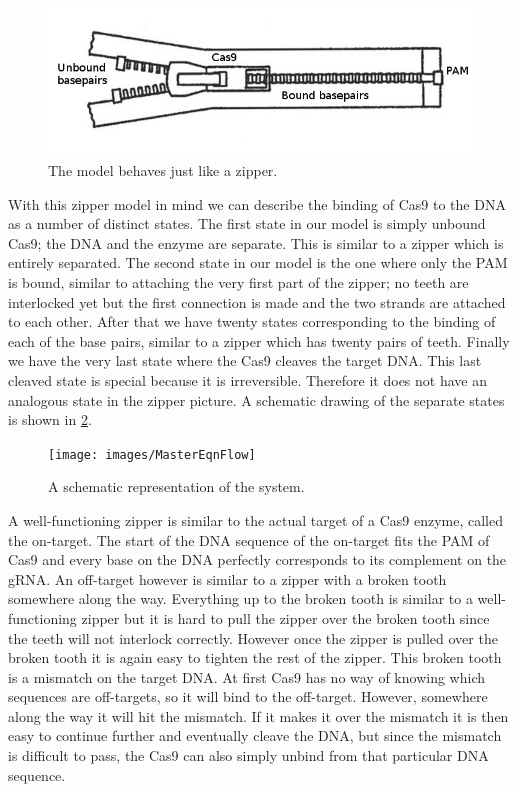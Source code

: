 \begin{figure}[H]
\begin{center}
\includegraphics[width=\textwidth]{images/zipper2}
\caption{The model behaves just like a zipper.}
\label{fig:zipper}
\end{center}
\end{figure}

With this zipper model in mind we can describe the binding of Cas9 to the DNA as a number of distinct states. The first state in our model is simply unbound Cas9; the DNA and the enzyme are separate. This is similar to a zipper which is entirely separated. The second state in our model is the one where only the PAM is bound, similar to attaching the very first part of the zipper; no teeth are interlocked yet but the first connection is made and the two strands are attached to each other. After that we have twenty states corresponding to the binding of each of the base pairs, similar to a zipper which has twenty pairs of teeth. Finally we have the very last state where the Cas9 cleaves the target DNA. This last cleaved state is special because it is irreversible. Therefore it does not have an analogous state in the zipper picture. A schematic drawing of the separate states is shown in \ref{fig:mastereqn_schematic1}.


\begin{figure}[H]
\begin{center}
\texttt{[image: images/MasterEqnFlow]}
\label{fig:mastereqn_schematic1}
\caption{A schematic representation of the system.}
\end{center}
\end{figure}


A well-functioning zipper is similar to the actual target of a Cas9 enzyme, called the on-target. The start of the DNA sequence of the on-target fits the PAM of Cas9 and every base on the DNA perfectly corresponds to its complement on the gRNA. An off-target however is similar to a zipper with a broken tooth somewhere along the way. Everything up to the broken tooth is similar to a well-functioning zipper but it is hard to pull the zipper over the broken tooth since the teeth will not interlock correctly. However once the zipper is pulled over the broken tooth it is again easy to tighten the rest of the zipper. This broken tooth is a mismatch on the target DNA. At first Cas9 has no way of knowing which sequences are off-targets, so it will bind to the off-target. However, somewhere along the way it will hit the mismatch. If it makes it over the mismatch it is then easy to continue further and eventually cleave the DNA, but since the mismatch is difficult to pass, the Cas9 can also simply unbind from that particular DNA sequence.

